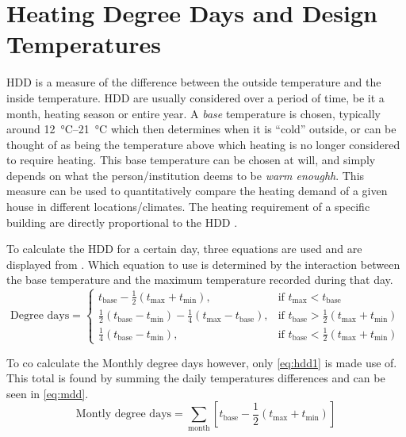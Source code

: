 \section{Heating Degree Days and Design Temperatures} \label{sec:hddanddesign}
\acs{HDD} is a measure of the difference between the outside temperature and the inside temperature. \acs{HDD} are usually considered over a period of time, be it a month, heating season or entire year. A \textit{base} temperature is chosen, typically around \qtyrange{12}{21}{\celsius} which then determines when it is ``cold'' outside, or can be thought of as being the temperature above which heating is no longer considered to require heating. This base temperature can be chosen at will, and simply depends on what the person/institution deems to be \textit{warm enoughh}. This measure can be used to quantitatively compare the heating demand of a given house in different locations/climates. The heating requirement of a specific building are directly proportional to the \ac{HDD} \cite{chartered_institution_of_building_services_engineers_environmental_2006}.

To calculate  the \ac{HDD} for a certain day, three equations are used and are displayed from . Which equation to use is determined by the interaction between the base temperature and the maximum temperature recorded during that day.  
\begin{equation}
    \text{Degree days} = \begin{cases}
        t_\text{base} - \frac12(t_\text{max} + t_\text{min}), & \text{if } t_\text{max} < t_\text{base} \label{eq:hdd1}\\
        \frac12(t_\text{base} - t_\text{min}) -\frac14(t_\text{max} -t_\text{base} ), & \text{if } t_\text{base} > \frac12(t_\text{max} + t_\text{min}) \\
        \frac14(t_\text{base} -t_\text{min} ), & \text{if } t_\text{base} <\frac12(t_\text{max} + t_\text{min}) %
     \end{cases}  
\end{equation}

To co calculate the Monthly degree days however, only \cref{eq:hdd1} is made use of. This total is found by summing the daily temperatures differences and can be seen in \cref{eq:mdd}.
\begin{equation}
    \text{Montly degree days} = \displaystyle\sum_\text{month} \left[t_\text{base} - \frac12(t_\text{max} + t_\text{min})\right] 
\end{equation}

